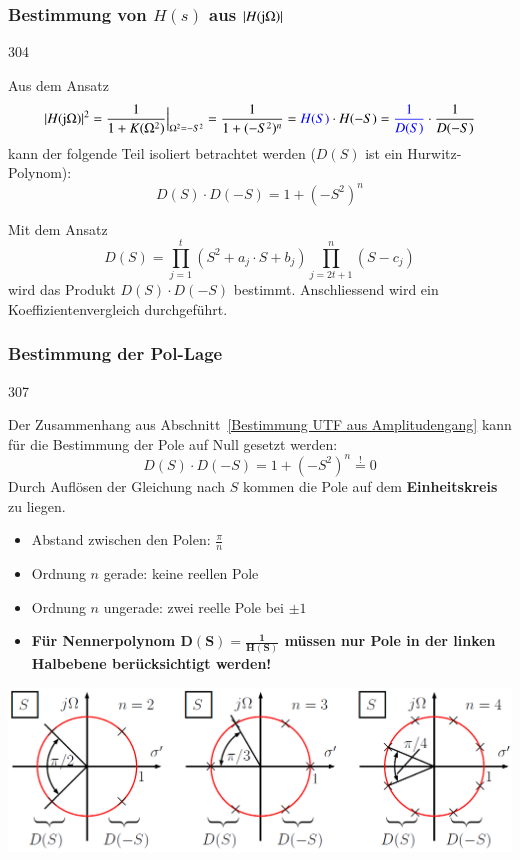 \subsubsection{Bestimmung von $H(s)$ aus $|H(\mathrm{j} \Omega)|$}{304}
\label{Bestimmung UTF aus Amplitudengang}

Aus dem Ansatz 
$$ | H(\mathrm{j} \Omega) |^2 = \frac{1}{1 + K(\Omega^2)} \Big|_{\Omega^2 = -S^2} = \frac{1}{1 + (-S^2)^n} = {\color{blue}H(S)} \cdot H(-S)
    = {\color{blue}\frac{1}{D(S)}} \cdot \frac{1}{D(-S)} $$
kann der folgende Teil isoliert betrachtet werden ($D(S)$ ist ein Hurwitz-Polynom):
$$ \boxed{ D(S) \cdot D(-S) = 1 + (-S^2)^n } $$

Mit dem Ansatz 
$$ \boxed{ D(S) = \prod\limits_{j=1}^{t} (S^2 + a_j \cdot S + b_j) \prod\limits_{j=2t+1}^{n} (S - c_j) } $$
wird das Produkt $D(S) \cdot D(-S)$ bestimmt. Anschliessend wird ein Koeffizientenvergleich durchgeführt.

\subsubsection{Bestimmung der Pol-Lage}{307}

Der Zusammenhang aus Abschnitt~\ref{Bestimmung UTF aus Amplitudengang} kann für die Bestimmung der Pole auf Null gesetzt werden:
$$ \boxed{ D(S) \cdot D(-S) = 1 + (-S^2)^n \overset{!}{=} 0 } $$
Durch Auflösen der Gleichung nach $S$ kommen die Pole auf dem \textbf{Einheitskreis} zu liegen.

\begin{itemize}
    \item Abstand zwischen den Polen: $\frac{\pi}{n}$
    \item Ordnung $n$ gerade: keine reellen Pole
    \item Ordnung $n$ ungerade: zwei reelle Pole bei $\pm 1$
    \item \textbf{Für Nennerpolynom $\bm{D(S) = \frac{1}{H(S)}}$ müssen nur Pole in der linken Halbebene berücksichtigt werden!}
\end{itemize}

\begin{center}
    \includegraphics[width=0.8\columnwidth]{images/filter_pollage_butterworth.png}
\end{center}



